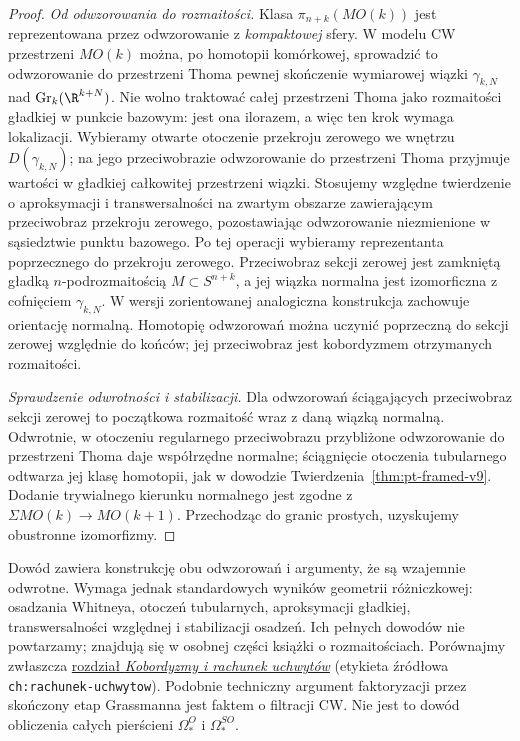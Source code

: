 \begin{proof}
\emph{Od odwzorowania do rozmaitości.}
Klasa $\pi_{n+k}(MO(k))$ jest reprezentowana
przez odwzorowanie z \emph{kompaktowej} sfery. W modelu
CW przestrzeni $MO(k)$ można, po homotopii
komórkowej, sprowadzić to odwzorowanie do przestrzeni
Thoma pewnej skończenie wymiarowej wiązki
$\gamma_{k,N}$ nad $\mathrm{Gr}_k(\R^{k+N})$.
Nie wolno traktować całej przestrzeni Thoma jako
rozmaitości gładkiej w punkcie bazowym: jest ona
ilorazem, a więc ten krok wymaga lokalizacji.
Wybieramy otwarte otoczenie przekroju zerowego
we wnętrzu $D(\gamma_{k,N})$; na jego przeciwobrazie
odwzorowanie do przestrzeni Thoma przyjmuje wartości
w gładkiej całkowitej przestrzeni wiązki.
Stosujemy względne twierdzenie o aproksymacji
i transwersalności na zwartym obszarze zawierającym
przeciwobraz przekroju zerowego, pozostawiając
odwzorowanie niezmienione w sąsiedztwie punktu bazowego.
Po tej operacji wybieramy reprezentanta poprzecznego
do przekroju zerowego. Przeciwobraz sekcji zerowej
jest zamkniętą gładką
$n$-podrozmaitością $M\subset S^{n+k}$, a jej
wiązka normalna jest izomorficzna z cofnięciem
$\gamma_{k,N}$. W wersji zorientowanej analogiczna
konstrukcja zachowuje orientację normalną.
Homotopię odwzorowań można uczynić poprzeczną do sekcji
zerowej względnie do końców; jej przeciwobraz jest
kobordyzmem otrzymanych rozmaitości.

\emph{Sprawdzenie odwrotności i stabilizacji.}
Dla odwzorowań ściągających przeciwobraz sekcji zerowej
to początkowa rozmaitość wraz z daną wiązką normalną.
Odwrotnie, w otoczeniu regularnego przeciwobrazu
przybliżone odwzorowanie do przestrzeni Thoma daje współrzędne
normalne; ściągnięcie otoczenia tubularnego odtwarza
jej klasę homotopii, jak w dowodzie
Twierdzenia~\ref{thm:pt-framed-v9}.
Dodanie trywialnego kierunku normalnego jest zgodne
z $\Sigma MO(k)\to MO(k+1)$. Przechodząc do granic
prostych, uzyskujemy obustronne izomorfizmy.
\end{proof}

\begin{uwaga}
Dowód zawiera konstrukcję obu odwzorowań i argumenty,
że są wzajemnie odwrotne. Wymaga jednak standardowych
wyników geometrii różniczkowej: osadzania Whitneya,
otoczeń tubularnych, aproksymacji gładkiej,
transwersalności względnej i stabilizacji osadzeń.
Ich pełnych dowodów nie powtarzamy; znajdują się
w osobnej części książki o rozmaitościach.
Porównajmy zwłaszcza
\href{https://github.com/dariusz-piekarz/mathematical_scipts/blob/biblioteka-matematyczna-iteracja-6/chapters/pl/differential_geometry_and_topology/19-kobordyzmy-i-rachunek-uchwytow.tex}{rozdział \emph{Kobordyzmy i rachunek uchwytów}}
(etykieta źródłowa \texttt{ch:rachunek-uchwytow}). Podobnie
techniczny argument faktoryzacji przez skończony
etap Grassmanna jest faktem o filtracji CW.
Nie jest to dowód obliczenia całych pierścieni
$\Omega_*^O$ i $\Omega_*^{SO}$.
\end{uwaga}



